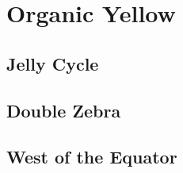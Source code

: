 \chapter{Organic Yellow}
\section{Jelly Cycle}
\lipsum[1-6]
\section{Double Zebra}
\lipsum[1-3]
\section{West of the Equator}
\lipsum[1-4]